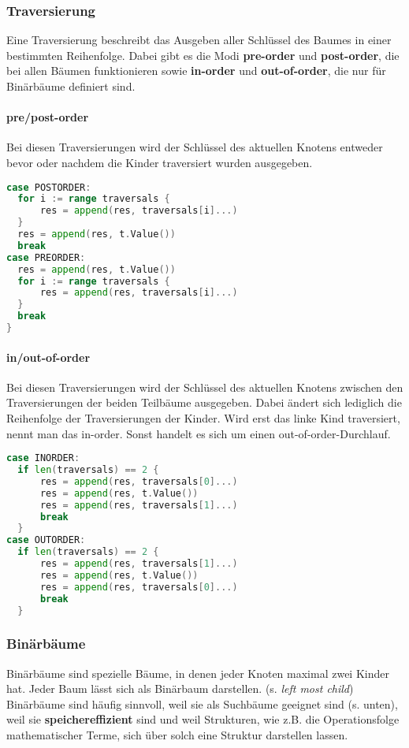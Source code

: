 \documentclass{article}
\begin{document}
\subsubsection{Traversierung}
Eine Traversierung beschreibt das Ausgeben aller Schlüssel des Baumes in einer bestimmten Reihenfolge. Dabei gibt es die Modi \textbf{pre-order} und \textbf{post-order}, die bei allen Bäumen funktionieren sowie \textbf{in-order} und \textbf{out-of-order}, die nur für Binärbäume definiert sind.
\paragraph{pre/post-order}
Bei diesen Traversierungen wird der Schlüssel des aktuellen Knotens entweder bevor oder nachdem die Kinder traversiert wurden ausgegeben. 
\begin{lstlisting}[language=Go]
case POSTORDER:
  for i := range traversals {
      res = append(res, traversals[i]...)
  }
  res = append(res, t.Value())
  break
case PREORDER:
  res = append(res, t.Value())
  for i := range traversals {
      res = append(res, traversals[i]...)
  }
  break
}
\end{lstlisting}
\paragraph{in/out-of-order}
Bei diesen Traversierungen wird der Schlüssel des aktuellen Knotens zwischen den Traversierungen der beiden Teilbäume ausgegeben. Dabei ändert sich lediglich die Reihenfolge der Traversierungen der Kinder. Wird erst das linke Kind traversiert, nennt man das in-order. Sonst handelt es sich um einen out-of-order-Durchlauf.
\begin{lstlisting}[language=Go]
case INORDER:
  if len(traversals) == 2 {
      res = append(res, traversals[0]...)
      res = append(res, t.Value())
      res = append(res, traversals[1]...)
      break
  }
case OUTORDER:
  if len(traversals) == 2 {
      res = append(res, traversals[1]...)
      res = append(res, t.Value())
      res = append(res, traversals[0]...)
      break
  }   
\end{lstlisting}
\subsubsection{Binärbäume}
Binärbäume sind spezielle Bäume, in denen jeder Knoten maximal zwei Kinder hat. Jeder Baum lässt sich als Binärbaum darstellen. (s. \emph{left most child})\\
Binärbäume sind häufig sinnvoll, weil sie als Suchbäume geeignet sind (s. unten), weil sie \textbf{speichereffizient} sind und weil Strukturen, wie z.B. die Operationsfolge mathematischer Terme, sich über solch eine Struktur darstellen lassen.
\end{document}
